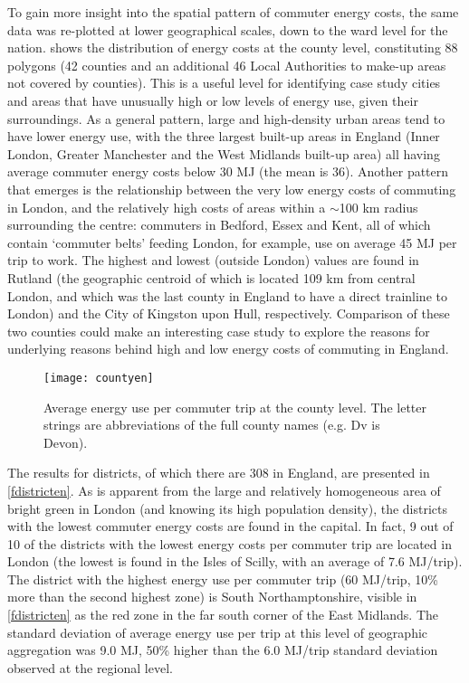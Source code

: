 To gain more insight into the spatial pattern of commuter energy costs,
the same data was re-plotted at lower geographical scales, down to the ward
level for the nation.  shows the distribution of energy costs
at the county level, constituting 88 polygons (42 counties and an additional 46
Local Authorities to make-up areas not covered by counties). This is a useful
level for identifying case study cities and areas that have unusually high
or low levels of energy use, given their surroundings. As a general pattern,
large and high-density urban areas tend to have lower energy use, with
the three largest built-up areas in England (Inner London, Greater Manchester
and the West Midlands built-up area) all having average commuter energy costs
below 30 MJ (the mean is 36). Another pattern that emerges is the relationship
between the very low energy costs of commuting in London, and the relatively high
costs of areas within a $\sim$100 km radius surrounding the centre: commuters in Bedford, Essex and
Kent, all of which contain `commuter belts' feeding London, for example, use
on average 45 MJ per trip to work. The highest and lowest (outside London)
values are found in Rutland (the geographic centroid of which is located 109
km from central London, and which was the last county in England to have
a direct trainline to London) and the City of Kingston upon Hull, respectively.
Comparison of these two counties could make an interesting case study
to explore the reasons for underlying reasons behind high and low
energy costs of commuting in England.

\begin{figure}[htbp]
\begin{center}
    \texttt{[image: countyen]}  \end{center}
  \caption[Average energy use per commuter trip at the county level]
  {Average energy use per commuter trip at the county level. The
  letter strings are abbreviations of the full county names (e.g. Dv is Devon).}
 \label{fcountyen}
\end{figure}

The results for districts, of which there are 308 in England,
are presented in \cref{fdistricten}.
As is apparent from the large and relatively homogeneous
area of bright green in London (and
knowing its high population density), the districts with the lowest
commuter energy costs are found in the capital. In fact,
9 out of 10 of the districts with the lowest energy costs per
commuter trip are located in London (the lowest is found in the
Isles of Scilly, with an average of 7.6 MJ/trip). The district with the
highest energy use per commuter trip (60 MJ/trip, 10\% more than the second
highest zone) is South Northamptonshire, visible
in \cref{fdistricten} as the red zone in the far south corner of the
East Midlands. The standard deviation of average energy use per trip at
this level of geographic aggregation was 9.0 MJ, 50\% higher than the
6.0 MJ/trip standard deviation observed at the regional level.

